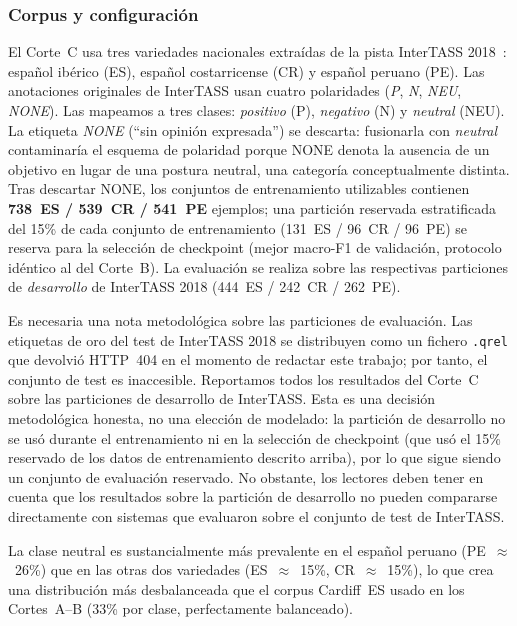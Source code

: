 \documentclass[conference]{IEEEtran}
\begin{document}
\subsubsection*{Corpus y configuración}

El Corte~C usa tres variedades nacionales extraídas de la pista
InterTASS 2018~\cite{martinezcamara2018tass}:
español ibérico (ES), español costarricense (CR) y español peruano (PE).
Las anotaciones originales de InterTASS usan cuatro polaridades
(\textit{P}, \textit{N}, \textit{NEU}, \textit{NONE}).
Las mapeamos a tres clases: \textit{positivo} (P),
\textit{negativo} (N) y \textit{neutral} (NEU).
La etiqueta \textit{NONE} (``sin opinión expresada'') se descarta: fusionarla
con \textit{neutral} contaminaría el esquema de polaridad porque NONE
denota la ausencia de un objetivo en lugar de una postura neutral, una categoría
conceptualmente distinta.
Tras descartar NONE, los conjuntos de entrenamiento utilizables contienen
\textbf{738~ES / 539~CR / 541~PE} ejemplos; una partición reservada estratificada
del 15\% de cada conjunto de entrenamiento (131~ES / 96~CR / 96~PE) se reserva
para la selección de checkpoint (mejor macro-F1 de validación, protocolo idéntico
al del Corte~B).
La evaluación se realiza sobre las respectivas particiones de \emph{desarrollo}
de InterTASS 2018 (444~ES / 242~CR / 262~PE).

Es necesaria una nota metodológica sobre las particiones de evaluación.
Las etiquetas de oro del test de InterTASS 2018 se distribuyen como un fichero
\texttt{.qrel} que devolvió HTTP~404 en el momento de redactar este trabajo; por
tanto, el conjunto de test es inaccesible.
Reportamos todos los resultados del Corte~C sobre las particiones de desarrollo
de InterTASS.
Esta es una decisión metodológica honesta, no una elección de modelado: la
partición de desarrollo no se usó durante el entrenamiento ni en la selección de
checkpoint (que usó el 15\% reservado de los datos de entrenamiento descrito
arriba), por lo que sigue siendo un conjunto de evaluación reservado.
No obstante, los lectores deben tener en cuenta que los resultados sobre la
partición de desarrollo no pueden compararse directamente con sistemas que
evaluaron sobre el conjunto de test de InterTASS.

La clase neutral es sustancialmente más prevalente en el español peruano
(PE~$\approx$~26\%) que en las otras dos variedades
(ES~$\approx$~15\%, CR~$\approx$~15\%), lo que crea una distribución más
desbalanceada que el corpus Cardiff~ES usado en los Cortes~A--B
(33\% por clase, perfectamente balanceado).
\end{document}

